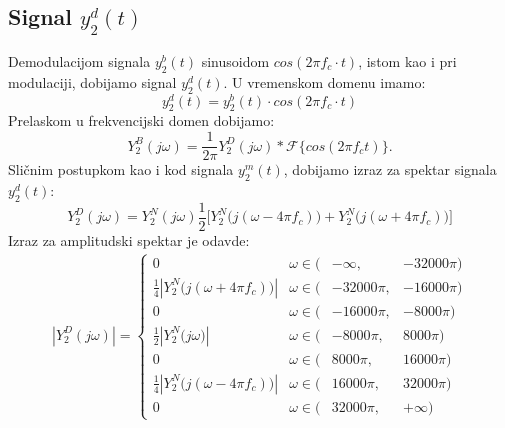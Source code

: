 \documentclass[titlepage,a4paper,12pt]{article}
\begin{document}
	\subsection{Signal $y_2^d(t)$}	
	Demodulacijom signala $y_2^b(t)$ sinusoidom $cos(2\pi f_c \cdot t)$, istom kao i pri modulaciji, dobijamo signal $y_2^d(t)$. U vremenskom domenu imamo:
	\begin{equation}
		y_2^d(t) = y_2^b(t)\cdot cos(2\pi f_c \cdot t)
	\end{equation}
	Prelaskom u frekvencijski domen dobijamo:
	\begin{equation}
		Y_2^B(j\omega) = \frac{1}{2\pi}Y_2^D(j\omega)*\mathcal{F}\Big\{cos(2\pi f_c t)\Big\}.
	\end{equation}
	Sličnim postupkom kao i kod signala $y_2^m(t)$, dobijamo izraz za spektar signala $y_2^d(t)$:
	\begin{equation}
		Y_2^D(j\omega) = Y_2^N(j\omega) \frac{1}{2}\Bigg[
		Y_2^N\big(j(\omega-4\pi f_c)\big)+Y_2^N\big(j(\omega+4\pi f_c)\big)
		\Bigg]
	\end{equation}
	Izraz za amplitudski spektar je odavde:
	\begin{gather}
		|Y_2^D(j\omega)| = \left\{
		\begin{array}{rlrr}
			0& \omega \in (&-\infty, &-32000\pi)\\
			\frac{1}{4}|Y_2^N\big(j(\omega+4\pi f_c)\big)|& \omega \in (&-32000\pi,& -16000\pi) \\
			0& \omega \in (&-16000\pi, &-8000\pi) \\
			\frac{1}{2}|Y_2^N\big(j\omega\big)|& \omega \in (&-8000\pi,& 8000\pi) \\
			0& \omega \in (&8000\pi,&16000\pi)\\
			\frac{1}{4}|Y_2^N\big(j(\omega-4\pi f_c)\big)|& \omega \in (&16000\pi,& 32000\pi) \\
			0& \omega \in (&32000\pi,&+\infty)
		\end{array}\right.
	\end{gather}
\end{document}
